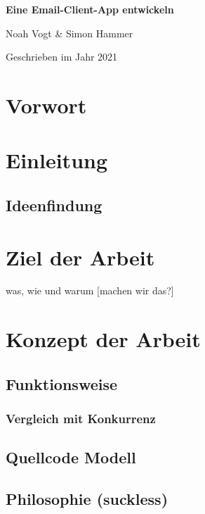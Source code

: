 \documentclass[a4paper,11pt]{article}
\begin{document}
\begin{titlepage}

\vspace*{1cm}
	\centering
	
	{\huge\bfseries Eine Email-Client-App entwickeln \par}
	\vspace{0.5cm}
	{\Large Noah Vogt \& Simon Hammer\par}
	\vspace{17cm}

	{\large Geschrieben im Jahr 2021\par}
	
\end{titlepage}

\tableofcontents
\pagebreak

\section{Vorwort}
\section{Einleitung}
\subsection{Ideenfindung}

\section{Ziel der Arbeit}

 was, wie und warum [machen wir das?]

\section{Konzept der Arbeit}

\subsection{Funktionsweise}
\subsubsection{Vergleich mit Konkurrenz}
\subsection{Quellcode Modell}
\subsection{Philosophie (suckless)}
\end{document}
